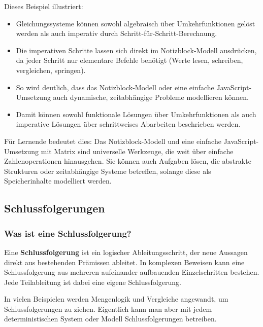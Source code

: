 \documentclass{article}
\begin{document}
        
Dieses Beispiel illustriert:

        \begin{itemize}
          \item Gleichungssysteme können sowohl algebraisch über Umkehrfunktionen gelöst werden als auch imperativ durch Schritt-für-Schritt-Berechnung.

          \item Die imperativen Schritte lassen sich direkt im Notizblock-Modell ausdrücken, da jeder Schritt nur elementare Befehle benötigt (Werte lesen, schreiben, vergleichen, springen).

          \item So wird deutlich, dass das Notizblock-Modell oder eine einfache JavaScript-Umsetzung auch dynamische, zeitabhängige Probleme modellieren können.

          \item Damit können sowohl funktionale Lösungen über Umkehrfunktionen als auch imperative Lösungen über schrittweises Abarbeiten beschrieben werden.

        \end{itemize}

        
Für Lernende bedeutet dies: Das Notizblock-Modell und eine einfache JavaScript-Umsetzung mit Matrix sind universelle Werkzeuge, die weit über einfache Zahlenoperationen hinausgehen. Sie können auch Aufgaben lösen, die abstrakte Strukturen oder zeitabhängige Systeme betreffen, solange diese als Speicherinhalte modelliert werden.    

  
    \subsection{Schlussfolgerungen}
  
    \subsubsection{Was ist eine Schlussfolgerung?}
    

      Eine \textbf{Schlussfolgerung} ist ein logischer Ableitungsschritt, der neue Aussagen direkt aus bestehenden Prämissen ableitet.  
      In komplexen Beweisen kann eine Schlussfolgerung aus mehreren aufeinander aufbauenden Einzelschritten bestehen. Jede Teilableitung ist dabei eine eigene Schlussfolgerung.
    


    

      In vielen Beispielen werden Mengenlogik und Vergleiche angewandt, um Schlussfolgerungen zu ziehen.  
      Eigentlich kann man aber mit jedem deterministischen System oder Modell Schlussfolgerungen betreiben.
    
\end{document}
